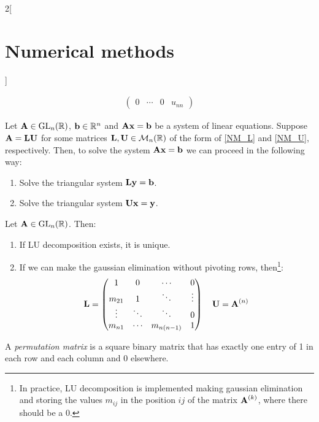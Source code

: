 \documentclass[../../../main.tex]{subfiles}
\begin{document}
\begin{multicols}{2}[\section{Numerical methods}]
\begin{definition}[LU descompostion]
\begin{gather}
\begin{pmatrix}
        0      & \cdots & 0      & u_{nn}
      \end{pmatrix}
    \end{gather}
  \end{definition}
  \begin{lemma}
    Let $\boldsymbol{\mathrm{A}}\in\mathrm{GL}_n(\mathbb{R})$, $\boldsymbol{\mathrm{b}}\in\mathbb{R}^n$ and $\boldsymbol{\mathrm{A}}\boldsymbol{\mathrm{x}}=\boldsymbol{\mathrm{b}}$ be a system of linear equations. Suppose $\boldsymbol{\mathrm{A}}=\boldsymbol{\mathrm{L}}\boldsymbol{\mathrm{U}}$ for some matrices $\boldsymbol{\mathrm{L}},\boldsymbol{\mathrm{U}}\in\mathcal{M}_n(\mathbb{R})$ of the form of \eqref{NM_L} and \eqref{NM_U}, respectively. Then, to solve the system $\boldsymbol{\mathrm{A}}\boldsymbol{\mathrm{x}}=\boldsymbol{\mathrm{b}}$ we can proceed in the following way:
    \begin{enumerate}
      \item Solve the triangular system $\boldsymbol{\mathrm{L}}\boldsymbol{\mathrm{y}}=\boldsymbol{\mathrm{b}}$.
      \item Solve the triangular system $\boldsymbol{\mathrm{U}}\boldsymbol{\mathrm{x}}=\boldsymbol{\mathrm{y}}$.
    \end{enumerate}
  \end{lemma}
  \begin{prop}
    Let $\boldsymbol{\mathrm{A}}\in\mathrm{GL}_n(\mathbb{R})$. Then:
    \begin{enumerate}
      \item If LU decomposition exists, it is unique.
      \item If we can make the gaussian elimination without pivoting rows, then\footnote{In practice, LU decomposition is implemented making gaussian elimination and storing the values $m_{ij}$ in the position $ij$ of the matrix $\boldsymbol{\mathrm{A}}^{(k)}$, where there should be a 0.}:
            $$
              \boldsymbol{\mathrm{L}}=
              \begin{pmatrix}
                1      & 0      & \cdots     & 0      \\
                m_{21} & 1      & \ddots     & \vdots \\
                \vdots & \ddots & \ddots     & 0      \\
                m_{n1} & \cdots & m_{n(n-1)} & 1
              \end{pmatrix}\quad
              \boldsymbol{\mathrm{U}}=\boldsymbol{\mathrm{A}}^{(n)}
            $$
    \end{enumerate}
  \end{prop}
  \begin{definition}
    A \textit{permutation matrix} is a square binary matrix that has exactly one entry of 1 in each row and each column and 0 elsewhere.

\end{definition}
\end{multicols}
\end{document}
